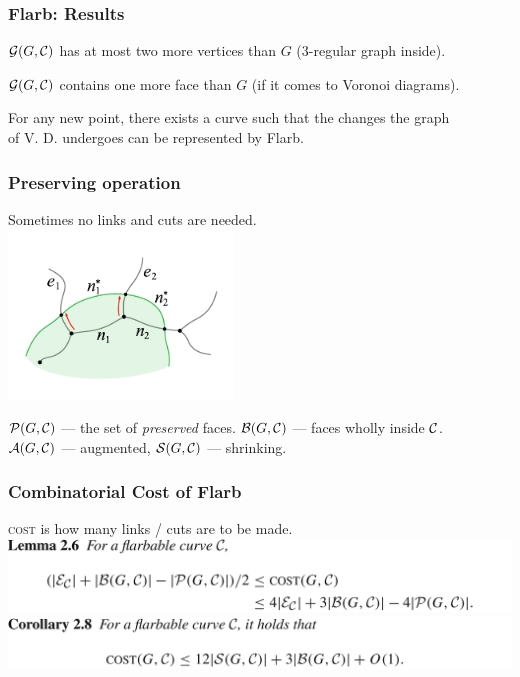 \begin{frame} \frametitle{Flarb: Results}
\begin{theorem}
	$\mathcal G(G, \mathcal C)$ has at most two more vertices than $G$ (3-regular graph inside).
\end{theorem} \medskip
\begin{theorem}
	$\mathcal G(G, \mathcal C)$ contains one more face than $G$ (if it comes to Voronoi diagrams).
\end{theorem} \medskip
\begin{theorem}
	For any new point, there exists a curve such that the changes the graph \\
	of V. D. undergoes can be represented by Flarb.
\end{theorem}
\end{frame}

\begin{frame} \frametitle{Preserving operation}
\begin{center}
	Sometimes no links and cuts are needed. \\ \vspace{-0.15cm}
	\includegraphics[width=6cm]{flarb/4cost-free}
\end{center} \vspace{-0.6cm}

$\mathcal P(G,\mathcal C)$ — the set of {\it preserved} faces. $\mathcal B(G,\mathcal C)$ — faces wholly inside $\mathcal C$. \\
$\mathcal A(G,\mathcal C)$ — augmented, $\mathcal S(G,\mathcal C)$ — shrinking.
\end{frame}

\begin{frame} \frametitle{Combinatorial Cost of Flarb} \label{pg:flarbcost}
\begin{center}
	{\scshape cost} is how many links / cuts are to be made. \\ \vspace{0.8cm}
	\includegraphics[width=14cm]{figs/2-6.png} \\ \vspace{0.8cm}
	\includegraphics[width=14cm]{figs/2-8.png}
\end{center}
\end{frame}

